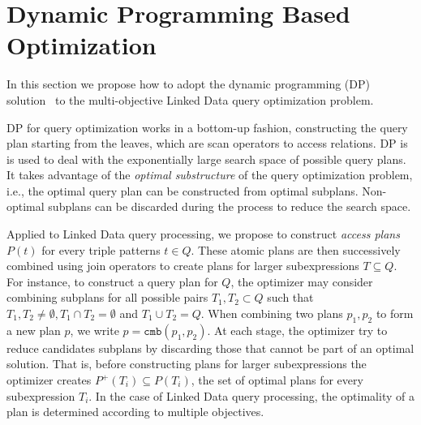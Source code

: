 \section{Dynamic Programming Based Optimization}
\label{sec:opt}


In this section we propose how to adopt the dynamic
programming (DP) solution~\cite{selinger_access_1979} to the 
multi-objective Linked Data query optimization problem. 

DP for query optimization works in a
bottom-up fashion, constructing the query plan starting from the
leaves, which are scan operators to access
relations. DP is is used to deal with the
exponentially large search space of possible query plans. It takes
advantage of the \emph{optimal substructure} of the query optimization
problem, i.e., the optimal query plan can be constructed from
optimal subplans. Non-optimal subplans can be
discarded during the process to reduce the search space.

Applied to Linked Data query processing, we propose to construct \emph{access plans} $P(t)$ for every triple patterns $t \in Q$. These atomic plans are then successively combined using join operators to create plans for larger subexpressions $T \subseteq Q$. For instance, to construct a query plan for $Q$, the optimizer may consider
combining subplans for all possible pairs $T_1,T_2 \subset Q$ such that
$T_1,T_2 \neq \emptyset, T_1 \cap T_2 = \emptyset$ and $T_1 \cup T_2 =
Q$. When combining two plans $p_1,p_2$ to form a new plan $p$, we
write $p = \mathtt{cmb}(p_1,p_2)$. At each stage, the optimizer 
try to reduce candidates subplans by discarding those that cannot be part of an optimal solution. That is, before constructing plans for larger subexpressions the optimizer creates $P^+(T_i) \subseteq
P(T_i)$, the set of optimal plans for every subexpression $T_i$. In the case of Linked Data
query processing, the optimality of a plan is determined according to
multiple objectives. 


